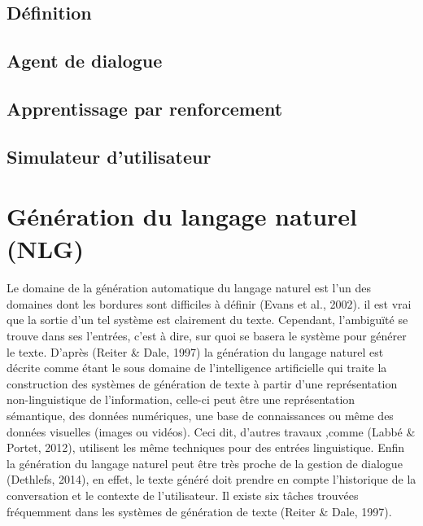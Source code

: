 	\subsection{Définition}
		\paragraph{}
	\subsection{Agent de dialogue}
		\paragraph{}
	\subsection{Apprentissage par renforcement}
		\paragraph{}
	\subsection{Simulateur d’utilisateur}
		\paragraph{}

\section{Génération du langage naturel (NLG)}
	\paragraph{}
	Le domaine de la génération automatique du langage naturel est l’un des domaines dont les bordures sont difficiles à définir (Evans et al., 2002). il est vrai que la sortie d’un tel système est clairement du texte. Cependant, l’ambiguïté se trouve dans ses l’entrées, c’est à dire, sur quoi se basera le système pour générer le texte. D’après (Reiter \& Dale, 1997) la génération du langage naturel est décrite comme étant le sous domaine de l’intelligence artificielle qui traite la construction des systèmes de génération de texte à partir d’une représentation non-linguistique de l’information, celle-ci peut être une représentation sémantique, des données numériques, une base de connaissances ou même des données visuelles (images ou vidéos). Ceci dit, d’autres travaux ,comme (Labbé \& Portet, 2012), utilisent les même techniques pour des entrées linguistique. Enfin la génération du langage naturel peut être très proche de la gestion de dialogue (Dethlefs, 2014), en effet, le texte généré doit prendre en compte l’historique de la conversation et le contexte de l’utilisateur.\newline
	Il existe six tâches trouvées fréquemment dans les systèmes de génération de texte (Reiter \& Dale, 1997).
	
